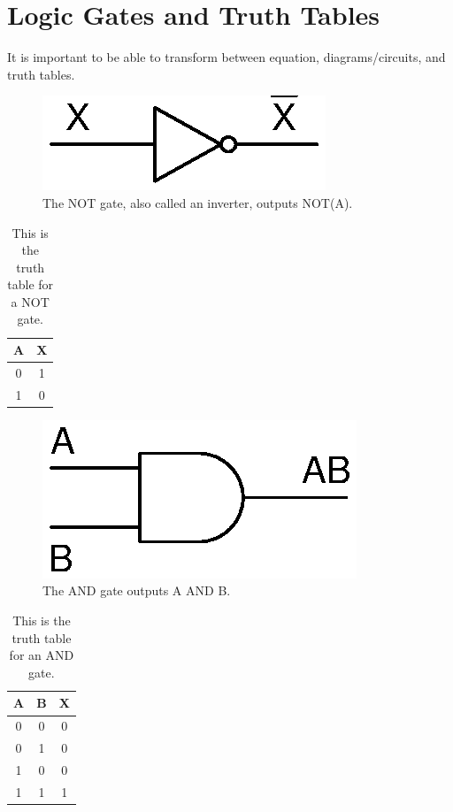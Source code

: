 \section{Logic Gates and Truth Tables}
It is important to be able to transform between equation, diagrams/circuits, and truth tables.
\begin{figure}[!htb]
	\centering
	\includegraphics[scale=0.7]{logic/NOT.eps}
	\caption{The NOT gate, also called an inverter, outputs NOT(A).}
	\label{fig:notgate}
\end{figure} 

\begin{table}[!ht]
	\centering
	\begin{tabular}{| c | c |}
		\hline
		A & X \\ 
		\hline
		0 & 1 \\ \hline
		1 & 0 \\ \hline
	\end{tabular}
	\caption{This is the truth table for a NOT gate.}
	\label{table:notgate}
\end{table}

\begin{figure}[!htb]
	\centering
	\includegraphics[scale=0.7]{logic/AND.eps}
	\caption{The AND gate outputs A AND B.}
	\label{fig:andgate}
\end{figure} 

\begin{table}[!ht]
	\centering
	\begin{tabular}{| c | c | c |}
		\hline
		A & B & X \\ 
		\hline
		0 & 0 & 0 \\ \hline
		0 & 1 & 0 \\ \hline
		1 & 0 & 0 \\ \hline
		1 & 1 & 1 \\ \hline
	\end{tabular}
	\caption{This is the truth table for an AND gate.}
	\label{table:andgate}
\end{table}

